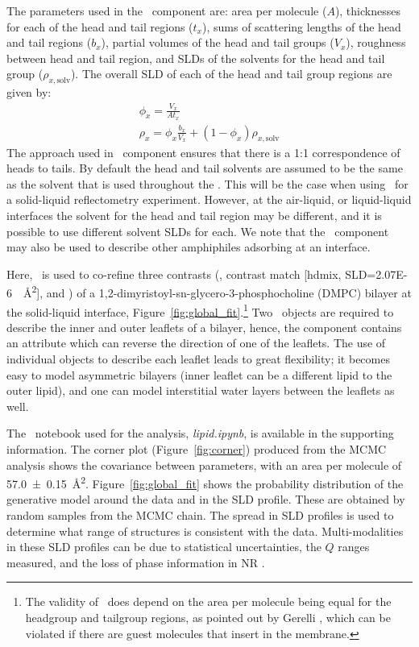 \documentclass[pdf,preprint]{iucr}
\begin{document}
The parameters used in the \LipidLeaflet\ component are: area per molecule ($A$), thicknesses for each of the head and tail regions ($t_x$), sums of scattering lengths of the head and tail regions ($b_x$), partial volumes of the head and tail groups ($V_x$), roughness between head and tail region, and SLDs of the solvents for the head and tail group ($\rho_{x,\mathrm{solv}}$). The overall SLD of each of the head and tail group regions are given by:
\begin{gather} 
\label{eqn:3} \phi_{x} = \frac{V_x}{At_x}\\
\rho_x =  \phi_{x} \frac{b_x}{V_x} + (1 - \phi_{x})\rho_{x,\mathrm{solv}} \label{eqn:4}
\end{gather}
The approach used in \LipidLeaflet\ component ensures that there is a 1:1 correspondence of heads to tails.
By default the head and tail solvents are assumed to be the same as the solvent that is used throughout the \Structure. This will be the case when using \LipidLeaflet\ for a solid-liquid reflectometry experiment. However, at the air-liquid, or liquid-liquid interfaces the solvent for the head and tail region may be different, and it is possible to use different solvent SLDs for each. We note that the \LipidLeaflet\ component may also be used to describe other amphiphiles adsorbing at an interface.

Here, \LipidLeaflet\ is used to co-refine three contrasts (,  contrast match [hdmix, SLD=\SI{2.07E-6}{\per\square\angstrom}], and ) of a 1,2-dimyristoyl-sn-glycero-3-phospho\-choline (DMPC) bilayer at the solid-liquid interface, Figure~\ref{fig:global_fit}.\footnote{The validity of \LipidLeaflet\ does depend on the area per molecule being equal for the headgroup and tailgroup regions, as pointed out by Gerelli \cite{Gerelli2016}, which can be violated if there are guest molecules that insert in the membrane.} Two \LipidLeaflet\ objects are required to describe the inner and outer leaflets of a bilayer, hence, the component contains an attribute which can reverse the direction of one of the leaflets. The use of individual objects to describe each leaflet leads to great flexibility; it becomes easy to model asymmetric bilayers (inner leaflet can be a different lipid to the outer lipid), and one can model interstitial water layers between the leaflets as well.

The \Jupyter\ notebook used for the analysis, \emph{lipid.ipynb}, is available in the supporting information. The corner plot (Figure~\ref{fig:corner}) produced from the MCMC analysis shows the covariance between parameters, with an area per molecule of \SI{57.0 \pm0.15}{\square\angstrom}. Figure~\ref{fig:global_fit} shows the probability distribution of the generative model around the data and in the SLD profile. These are obtained by random samples from the MCMC chain. The spread in SLD profiles is used to determine what range of structures is consistent with the data. Multi-modalities in these SLD profiles can be due to statistical uncertainties, the $Q$ ranges measured, and the loss of phase information in NR \cite{Majkrzak1999, Heinrich2009}.
\end{document}
